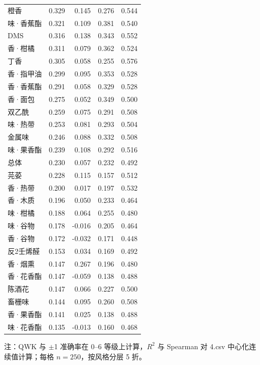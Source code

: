 \documentclass[zihao=-4,a4paper,UTF8,fontset=none]{ctexart}
\begin{document}
\begin{longtable}{@{}p{}rrrr@{}}
橙香 & 0.329 & 0.145 & 0.276 & 0.544 \\
味·香蕉酯 & 0.321 & 0.109 & 0.381 & 0.540 \\
DMS & 0.316 & 0.138 & 0.343 & 0.552 \\
香·柑橘 & 0.311 & 0.079 & 0.362 & 0.524 \\
丁香 & 0.305 & 0.058 & 0.255 & 0.576 \\
香·指甲油 & 0.299 & 0.095 & 0.353 & 0.528 \\
香·香蕉酯 & 0.291 & 0.058 & 0.329 & 0.528 \\
香·面包 & 0.275 & 0.052 & 0.349 & 0.500 \\
双乙酰 & 0.259 & 0.075 & 0.291 & 0.508 \\
味·热带 & 0.253 & 0.081 & 0.293 & 0.504 \\
金属味 & 0.246 & 0.088 & 0.332 & 0.508 \\
味·果香酯 & 0.239 & 0.108 & 0.292 & 0.516 \\
总体 & 0.230 & 0.057 & 0.232 & 0.492 \\
芫荽 & 0.228 & 0.115 & 0.157 & 0.512 \\
香·热带 & 0.200 & 0.017 & 0.197 & 0.532 \\
香·木质 & 0.196 & 0.050 & 0.233 & 0.464 \\
味·柑橘 & 0.188 & 0.064 & 0.255 & 0.480 \\
味·谷物 & 0.178 & -0.016 & 0.205 & 0.464 \\
香·谷物 & 0.172 & -0.032 & 0.171 & 0.448 \\
反2壬烯醛 & 0.153 & 0.034 & 0.169 & 0.492 \\
香·烟熏 & 0.147 & 0.267 & 0.196 & 0.480 \\
香·花香酯 & 0.147 & -0.059 & 0.138 & 0.488 \\
陈酒花 & 0.147 & 0.066 & 0.227 & 0.500 \\
畜栅味 & 0.144 & 0.095 & 0.260 & 0.508 \\
香·果香酯 & 0.141 & 0.025 & 0.138 & 0.488 \\
味·花香酯 & 0.135 & -0.013 & 0.160 & 0.468 \\
\end{longtable}

\noindent\footnotesize 注：QWK 与 $\pm$1 准确率在 0--6 等级上计算，$R^2$ 与 Spearman 对 4.csv 中心化连续值计算；每格 $n=250$，按风格分层 5 折。
\end{document}
